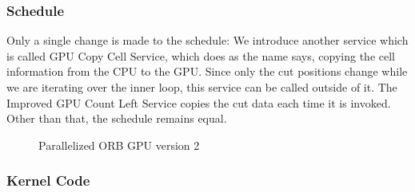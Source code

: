 \documentclass[]{article}
\begin{document}
\subsubsection{Schedule}

Only a single change is made to the schedule: We introduce another service which is called GPU Copy Cell Service, which does as the name says, copying the cell information from the CPU to the GPU. Since only the cut positions change while we are iterating over the inner loop, this service can be called outside of it. The Improved GPU Count Left Service copies the cut data each time it is invoked. Other than that, the schedule remains equal. 

\begin{figure}[H]
	\begin{center}
	\end{center}
	\caption{Parallelized ORB GPU version 2}
	\label{fig:orbgpup2}
\end{figure}


\subsubsection{Kernel Code}
\end{document}
